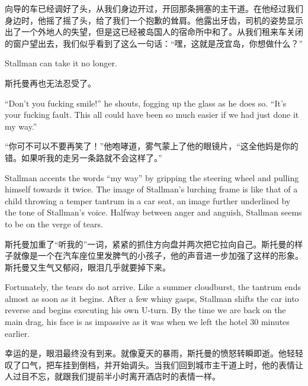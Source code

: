 \ifdefined\chs
向导的车已经调好了头，从我们身边开过，开回那条拥塞的主干道。在他经过我们身边时，他摇了摇了头，给了我们一个抱歉的耸肩。他露出牙齿，司机的姿势显示出了一个外地人的失望，但是这已经被岛国人的宿命所中和了。从我们租来车关闭的窗户望出去，我们似乎看到了这么一句话：``嘿，这就是茂宜岛，你想做什么？''
\fi

\ifdefined\eng
Stallman can take it no longer.
\fi

\ifdefined\chs
斯托曼再也无法忍受了。
\fi

\ifdefined\eng
``Don't you fucking smile!'' he shouts, fogging up the glass as he does so. ``It's your fucking fault. This all could have been so much easier if we had just done it my way.'' %
\fi

\ifdefined\chs
``你可不可以不要再笑了！''他咆哮道，雾气蒙上了他的眼镜片，``这全他妈是你的错。如果听我的走另一条路就不会这样了。''%
\fi

\ifdefined\eng
Stallman accents the words ``my way'' by gripping the steering wheel and pulling himself towards it twice. The image of Stallman's lurching frame is like that of a child throwing a temper tantrum in a car seat, an image further underlined by the tone of Stallman's voice. Halfway between anger and anguish, Stallman seems to be on the verge of tears.
\fi

\ifdefined\chs
斯托曼加重了``听我的''一词，紧紧的抓住方向盘并两次把它拉向自己。斯托曼的样子就像是一个在汽车座位里发脾气的小孩子，他的声音进一步加强了这样的形象。斯托曼又生气又郁闷，眼泪几乎就要掉下来。
\fi

\ifdefined\eng
Fortunately, the tears do not arrive. Like a summer cloudburst, the tantrum ends almost as soon as it begins. After a few whiny gasps, Stallman shifts the car into reverse and begins executing his own U-turn. By the time we are back on the main drag, his face is as impassive as it was when we left the hotel 30 minutes earlier.
\fi

\ifdefined\chs
幸运的是，眼泪最终没有到来。就像夏天的暴雨，斯托曼的愤怒转瞬即逝。他轻轻叹了口气，把车挂到倒档，并开始调头。当我们回到城市主干道上时，他的表情让人过目不忘，就跟我们提前半小时离开酒店时的表情一样。
\fi

